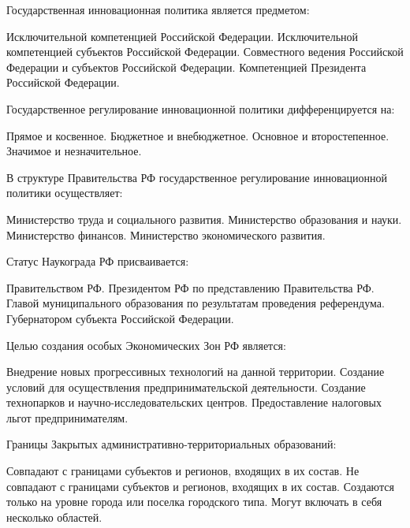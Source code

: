 \documentclass[12pt, table]{exam}
\begin{document}
\begin{questions}
\begin{multicols}{2}
\question Государственная инновационная политика является предметом:
\begin{choices}
	\choice Исключительной компетенцией Российской Федерации.
	\choice Исключительной компетенцией субъектов Российской Федерации.
	\CC Совместного ведения Российской Федерации и субъектов Российской Федерации.
	\choice Компетенцией Президента Российской Федерации.
\end{choices}

\question Государственное регулирование инновационной политики дифференцируется на:
\begin{choices}
	\choice Прямое и косвенное.
	\CC Бюджетное и внебюджетное.
	\choice Основное и второстепенное.
	\choice Значимое и незначительное.
\end{choices}

\question В структуре Правительства РФ государственное регулирование инновационной политики осуществляет:
\begin{choices}
	\choice Министерство труда и социального развития.
	\CC Министерство образования и науки.
	\choice Министерство финансов.
	\choice Министерство экономического развития.
\end{choices}

\question Статус Наукограда РФ присваивается:
\begin{choices}
	\CC Правительством РФ.
	\choice Президентом РФ по представлению Правительства РФ.
	\choice Главой муниципального образования по результатам проведения референдума.
	\choice Губернатором субъекта Российской Федерации.
\end{choices}

\question Целью создания особых Экономических Зон РФ является:
\begin{choices}
	\CC Внедрение новых прогрессивных технологий на данной территории.
	\choice Создание условий для осуществления предпринимательской деятельности.
	\choice Создание технопарков и научно-исследовательских центров.
	\choice Предоставление налоговых льгот предпринимателям.
\end{choices}

\question Границы Закрытых административно-территориальных образований:
\begin{choices}
	\choice Совпадают с границами субъектов и регионов, входящих в их состав.
	\CC Не совпадают с границами субъектов и регионов, входящих в их состав. 
	\choice Создаются только на уровне города или поселка городского типа.
	\choice Могут включать в себя несколько областей.
\end{choices}


\end{multicols}
\end{questions}
\end{document}
